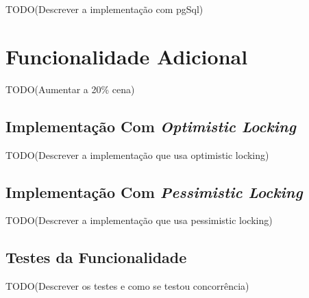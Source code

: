 TODO(Descrever a implementação com pgSql)

%
%
\section{Funcionalidade Adicional} \label{sec33}

TODO(Aumentar a 20\% cena)

%
%
\subsection{Implementação Com \textit{Optimistic Locking}} \label{sec331}

TODO(Descrever a implementação que usa optimistic locking)

%
%
\subsection{Implementação Com \textit{Pessimistic Locking}} \label{sec332}

TODO(Descrever a implementação que usa pessimistic locking)

%
%
\subsection{Testes da Funcionalidade}\label{sec333}

TODO(Descrever os testes e como se testou concorrência)